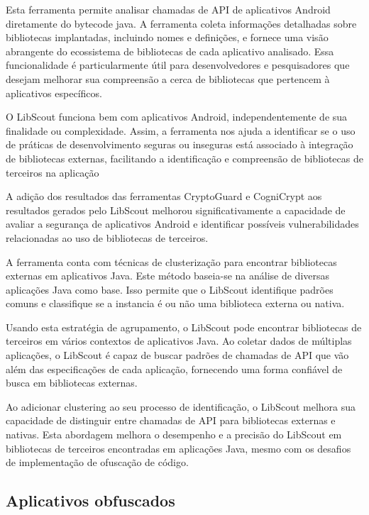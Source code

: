 Esta ferramenta permite analisar chamadas de API de aplicativos Android diretamente do bytecode java. A ferramenta coleta informações detalhadas sobre bibliotecas implantadas, incluindo nomes e definições, e fornece uma visão abrangente do ecossistema de bibliotecas de cada aplicativo analisado. Essa funcionalidade é particularmente útil para desenvolvedores e pesquisadores que desejam melhorar sua compreensão a cerca de bibliotecas que pertencem à aplicativos específicos.

O LibScout funciona bem com aplicativos Android, independentemente de sua finalidade ou complexidade. Assim, a ferramenta nos ajuda a identificar se o uso de práticas de desenvolvimento seguras ou inseguras está associado à integração de bibliotecas externas, facilitando a identificação e compreensão de bibliotecas de terceiros na aplicação

A adição dos resultados das ferramentas CryptoGuard e CogniCrypt aos resultados gerados pelo LibScout melhorou significativamente a capacidade de avaliar a segurança de aplicativos Android e identificar possíveis vulnerabilidades relacionadas ao uso de bibliotecas de terceiros.

A ferramenta conta com técnicas de clusterização para encontrar bibliotecas externas em aplicativos Java. Este método baseia-se na análise de diversas aplicações Java como base. Isso permite que o LibScout identifique padrões comuns e classifique se a instancia é ou não uma biblioteca externa ou nativa.

Usando esta estratégia de agrupamento, o LibScout pode encontrar bibliotecas de terceiros em vários contextos de aplicativos Java. Ao coletar dados de múltiplas aplicações, o LibScout é capaz de buscar padrões de chamadas de API que vão além das especificações de cada aplicação, fornecendo uma forma confiável de busca em bibliotecas externas.

Ao adicionar clustering ao seu processo de identificação, o LibScout melhora sua capacidade de distinguir entre chamadas de API para bibliotecas externas e nativas. Esta abordagem melhora o desempenho e a precisão do LibScout em bibliotecas de terceiros encontradas em aplicações Java, mesmo com os desafios de implementação de ofuscação de código.

\subsection{Aplicativos obfuscados} %

